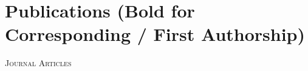 \documentclass[paper=a4,fontsize=11pt]{scrartcl}
\begin{document}
\section*{Publications (Bold for Corresponding / First Authorship)}

%
%

\textsc{Journal Articles}
\end{document}
